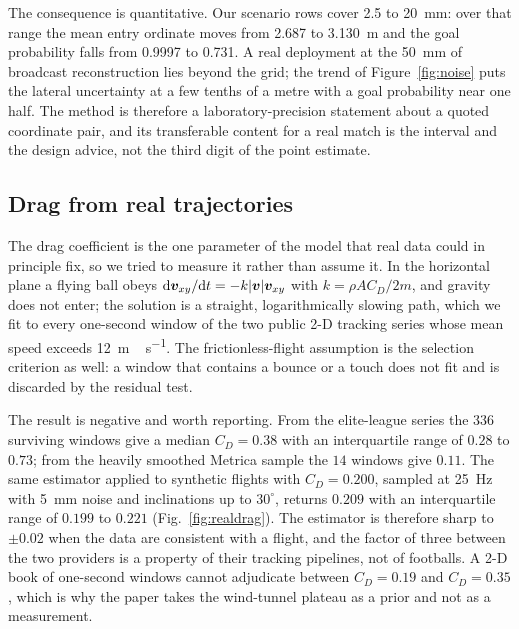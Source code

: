 The consequence is quantitative. Our scenario rows cover \SI{2.5}{} to
\SI{20}{mm}: over that range the mean entry ordinate moves from \SI{2.687}{} to
\SI{3.130}{m} and the goal probability falls from \num{0.9997} to \num{0.731}. A
real deployment at the \SI{50}{mm} of broadcast reconstruction lies beyond the
grid; the trend of Figure~\ref{fig:noise} puts the lateral uncertainty at a
few tenths of a metre with a goal probability near one half. The method is
therefore a laboratory-precision statement about a quoted coordinate pair, and
its transferable content for a real match is the interval and the design advice,
not the third digit of the point estimate.

\subsection{Drag from real trajectories}
\label{sec:realdrag}

The drag coefficient is the one parameter of the model that real data could in
principle fix, so we tried to measure it rather than assume it. In the horizontal
plane a flying ball obeys $\mathrm{d}\bm{v}_{xy}/\mathrm{d} t=-k|\bm{v}|\bm{v}_{xy}$ with
$k=\rho AC_D/2m$, and gravity does not enter; the solution is a straight,
logarithmically slowing path, which we fit to every one-second window of the two
public 2-D tracking series whose mean speed exceeds \SI{12}{m\,s^{-1}}. The
frictionless-flight assumption is the selection criterion as well: a window that
contains a bounce or a touch does not fit and is discarded by the residual test.

The result is negative and worth reporting. From the elite-league series
\citep{bassek2025} the $336$ surviving windows give a median $C_D=0.38$ with an
interquartile range of $0.28$ to $0.73$; from the heavily smoothed Metrica sample \citep{metrica2020}
the $14$ windows give $0.11$. The same estimator applied to synthetic flights
with $C_D=0.200$, sampled at \SI{25}{Hz} with \SI{5}{mm} noise and inclinations
up to $30^\circ$, returns $0.209$ with an interquartile range of $0.199$ to
$0.221$ (Fig.~\ref{fig:realdrag}). The estimator is therefore sharp to $\pm0.02$
when the data are consistent with a flight, and the factor of three between the
two providers is a property of their tracking pipelines, not of footballs. A 2-D
book of one-second windows cannot adjudicate between $C_D=0.19$ and $C_D=0.35$,
which is why the paper takes the wind-tunnel plateau as a prior and not as a
measurement.

